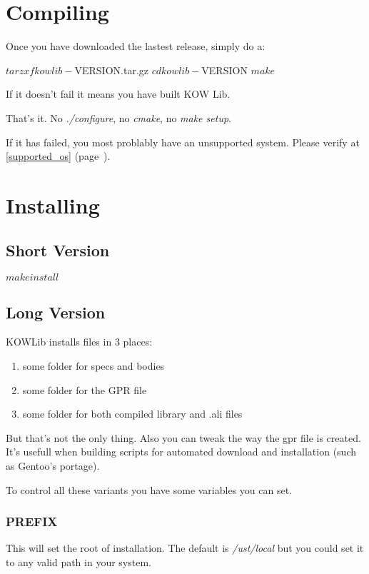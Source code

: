 \documentclass[english,letterpaper]{book}
\newcommand\Ref[1]{\textsection\ref{#1} (page~\pageref{#1})}
\begin{document}
\section{Compiling}
\label{getting_it:compiling}
Once you have downloaded the lastest release, simply do a:

\begin{bash}
$ tar zxf kowlib-${VERSION}.tar.gz
$ cd kowlib-${VERSION}
$ make
$
\end{bash}

If it doesn't fail it means you have built KOW Lib. 

That's it. No \emph{./configure}, no \emph{cmake}, no \emph{make setup}.

If it has failed, you most problably have an unsupported system. Please verify
at \Ref{supported_os}.

\section{Installing}
\label{getting_it:installing}


\subsection{Short Version}

\begin{bash}
$ make install
$
\end{bash}


\subsection{Long Version}
KOWLib installs files in 3 places:
\begin{enumerate}
	\item some folder for specs and bodies
	\item some folder for the GPR file
	\item some folder for both compiled library and .ali files
\end{enumerate}

But that's not the only thing. Also you can tweak the way the gpr file is created.
It's usefull when building scripts for automated download and installation (such as
Gentoo's portage).

To control all these variants you have some variables you can set.

\subsubsection{PREFIX}
This will set the root of installation. The default is \emph{/ust/local} but you
could set it to any valid path in your system.
\end{document}
